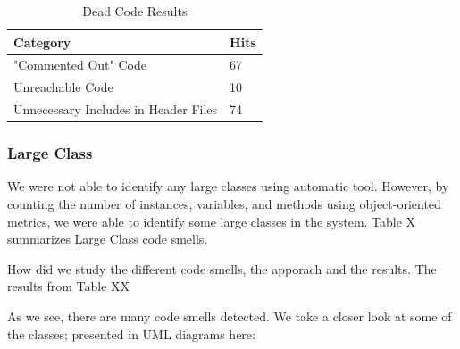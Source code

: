 \begin{table}[]
\centering
\caption{Dead Code Results}
\label{tab:deadCode}
\begin{tabular}{|l|l|}
\hline
\textbf{Category}		& 	\textbf{Hits} \\ \hline
"Commented Out" Code 			&	67  \\ \hline
Unreachable Code 	& 	10	 \\ \hline
Unnecessary Includes in Header Files 	& 	74	 \\ \hline
\end{tabular}
\end{table}


\subsubsection{Large Class}
We were not able to identify any large classes using automatic tool. However, by counting the number of instances, variables, and methods using object-oriented metrics, we were able to identify some large classes in the system. Table X summarizes Large Class code smells. 





How did we study the different code smells, the apporach and the results.
The results from Table XX

As we see, there are many code smells detected. We take a closer look at some of the classes; presented in UML diagrams here:




































